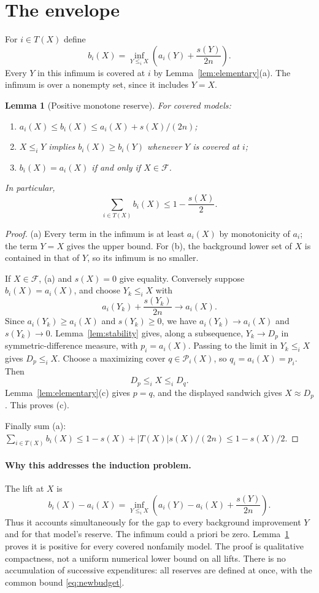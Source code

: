 \documentclass[11pt]{article}
\newtheorem{lemma}[theorem]{Lemma}
\theoremstyle{remark}
\newcommand{\Pc}{\mathcal P}
\newcommand{\F}{\mathcal F}
\begin{document}
\section{The envelope}

For $i\in T(X)$ define
\[
 b_i(X)=\inf_{Y\le_iX}
       \left(a_i(Y)+\frac{s(Y)}{2n}\right).
 \tag{2}\label{eq:envelope}
\]
Every $Y$ in this infimum is covered at $i$ by Lemma~\ref{lem:elementary}(a).
The infimum is over a nonempty set, since it includes $Y=X$.

\begin{lemma}[Positive monotone reserve]\label{lem:envelope}
For covered models:
\begin{enumerate}[label=(\alph*)]
\item $a_i(X)\le b_i(X)\le a_i(X)+s(X)/(2n)$;
\item $X\le_iY$ implies $b_i(X)\ge b_i(Y)$ whenever $Y$ is covered at $i$;
\item $b_i(X)=a_i(X)$ if and only if $X\in\F$.
\end{enumerate}
In particular,
\[
 \sum_{i\in T(X)}b_i(X)\le1-\frac{s(X)}2.
 \tag{3}\label{eq:newbudget}
\]
\end{lemma}
\begin{proof}
(a) Every term in the infimum is at least $a_i(X)$ by monotonicity of $a_i$;
the term $Y=X$ gives the upper bound. For (b), the background lower set of
$X$ is contained in that of $Y$, so its infimum is no smaller.

If $X\in\F$, (a) and $s(X)=0$ give equality. Conversely suppose
$b_i(X)=a_i(X)$, and choose $Y_k\le_iX$ with
\[
 a_i(Y_k)+\frac{s(Y_k)}{2n}\longrightarrow a_i(X).
\]
Since $a_i(Y_k)\ge a_i(X)$ and $s(Y_k)\ge0$, we have
$a_i(Y_k)\to a_i(X)$ and $s(Y_k)\to0$. Lemma~\ref{lem:stability} gives,
along a subsequence, $Y_k\to D_p$ in symmetric-difference measure, with
$p_i=a_i(X)$. Passing to the limit in $Y_k\le_iX$ gives $D_p\le_iX$.
Choose a maximizing cover $q\in\Pc_i(X)$, so $q_i=a_i(X)=p_i$. Then
\[
 D_p\le_iX\le_iD_q.
\]
Lemma~\ref{lem:elementary}(c) gives $p=q$, and the displayed sandwich gives
$X\approx D_p$. This proves (c).

Finally sum (a):
$\sum_{i\in T(X)}b_i(X)\le1-s(X)+|T(X)|s(X)/(2n)\le1-s(X)/2$.
\end{proof}

\paragraph{Why this addresses the induction problem.}
The lift at $X$ is
\[
 b_i(X)-a_i(X)
 =\inf_{Y\le_iX}\left(a_i(Y)-a_i(X)+\frac{s(Y)}{2n}\right).
\]
Thus it accounts simultaneously for the gap to every background improvement
$Y$ and for that model's reserve. The infimum could a priori be zero.
Lemma~\ref{lem:envelope} proves it is positive for every covered nonfamily
model. The proof is qualitative compactness, not a uniform numerical lower
bound on all lifts. There is no accumulation of successive expenditures:
all reserves are defined at once, with the common bound \eqref{eq:newbudget}.
\end{document}
